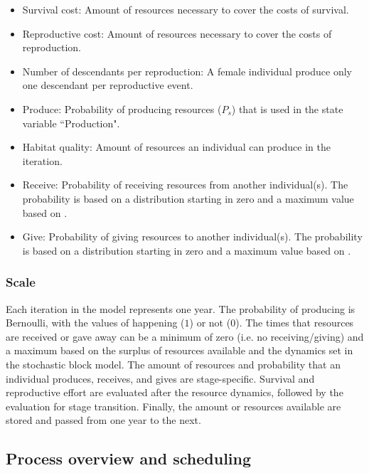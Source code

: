 \documentclass{article}
\begin{document}
\begin{itemize}
    \item Survival cost: Amount of resources necessary to cover the costs of survival.
    \item Reproductive cost: Amount of resources necessary to cover the costs of reproduction.
    \item Number of descendants per reproduction: A female individual produce only one descendant per reproductive event.
    \item Produce: Probability of producing resources ($P_s$) that is used in the state variable ``Production".
    \item Habitat quality: Amount of resources an individual can produce in the iteration.
    \item Receive: Probability of receiving resources from another individual(s). The probability is based on a distribution starting in zero and a maximum value based on \cite{gurven2004give}.
    \item Give: Probability of giving resources to another individual(s). The probability is based on a distribution starting in zero and a maximum value based on \cite{gurven2004give}.
\end{itemize}

\subsubsection{Scale}

Each iteration in the model represents one year. The probability  of producing is Bernoulli, with the values of happening ($1$) or not ($0$). The times that resources are received or gave away can be a minimum of zero (i.e. no receiving/giving) and a maximum based on the surplus of resources available and the dynamics set in the stochastic block model. The amount of resources and probability that an individual produces, receives, and gives are stage-specific. Survival and reproductive effort are evaluated after the resource dynamics, followed by the evaluation for stage transition. Finally, the amount or resources available are stored and passed from one year to the next.

\subsection{Process overview and scheduling}
\end{document}
